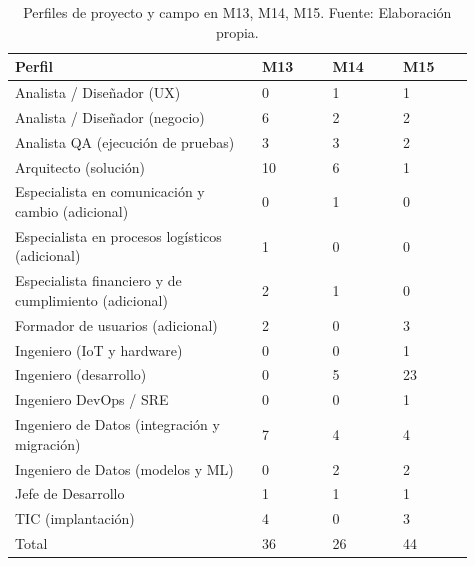 \documentclass[11pt]{article}
\begin{document}
\begingroup
\small
\begin{longtable}{@{}p{0.49\linewidth}p{0.14\linewidth}p{0.14\linewidth}p{0.14\linewidth}@{}}
\caption[Perfiles de proyecto y campo en M13, M14, M15]{Perfiles de proyecto y campo en M13, M14, M15. Fuente: Elaboración propia.}\label{tab:t15-9}\\
\toprule
\textbf{Perfil} & \textbf{M13} & \textbf{M14} & \textbf{M15} \\
\midrule
\endhead
\bottomrule
\endlastfoot
Analista / Diseñador (UX) & 0 & 1 & 1 \\
Analista / Diseñador (negocio) & 6 & 2 & 2 \\
Analista QA (ejecución de pruebas) & 3 & 3 & 2 \\
Arquitecto (solución) & 10 & 6 & 1 \\
Especialista en comunicación y cambio (adicional) & 0 & 1 & 0 \\
Especialista en procesos logísticos (adicional) & 1 & 0 & 0 \\
Especialista financiero y de cumplimiento (adicional) & 2 & 1 & 0 \\
Formador de usuarios (adicional) & 2 & 0 & 3 \\
Ingeniero (IoT y hardware) & 0 & 0 & 1 \\
Ingeniero (desarrollo) & 0 & 5 & 23 \\
Ingeniero DevOps / SRE & 0 & 0 & 1 \\
Ingeniero de Datos (integración y migración) & 7 & 4 & 4 \\
Ingeniero de Datos (modelos y ML) & 0 & 2 & 2 \\
Jefe de Desarrollo & 1 & 1 & 1 \\
TIC (implantación) & 4 & 0 & 3 \\
Total & 36 & 26 & 44 \\
\end{longtable}
\endgroup
\end{document}
